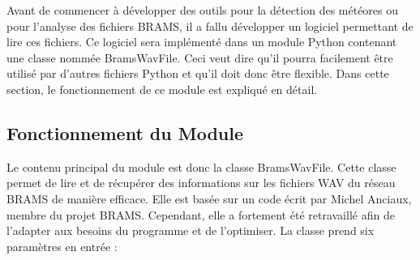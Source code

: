 \documentclass[11pt]{article}
\begin{document}
Avant de commencer à développer des outils pour la détection des météores ou pour l'analyse des fichiers BRAMS, il a fallu développer un logiciel permettant de lire ces fichiers.
Ce logiciel sera implémenté dans un module Python contenant une classe nommée BramsWavFile.
Ceci veut dire qu'il pourra facilement être utilisé par d'autres fichiers Python et qu'il doit donc être flexible.
Dans cette section, le fonctionnement de ce module est expliqué en détail.

\subsection{Fonctionnement du Module}

Le contenu principal du module est donc la classe BramsWavFile.
Cette classe permet de lire et de récupérer des informations sur les fichiers WAV du réseau BRAMS de manière efficace.
Elle est basée sur un code écrit par Michel Anciaux, membre du projet BRAMS.
Cependant, elle a fortement été retravaillé afin de l'adapter aux besoins du programme et de l'optimiser.
La classe prend six paramètres en entrée :
\end{document}
